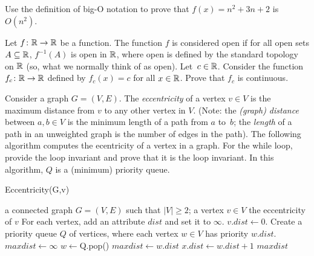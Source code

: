 \documentclass{article}
\begin{document}
\nextprob{}
Use the definition of big-O notation to prove that $f(x)=n^2 + 3n +2$ is
$O(n^2)$.

\nextprob{}
Let $f \colon {\mathbb R} \to {\mathbb R}$ be a function.
The function $f$ is considered open if for all open sets $A \subseteq {\mathbb R}$,
$f^{-1}(A)$ is open in ${\mathbb R}$, where open is defined by the standard topology on
${\mathbb R}$ (so, what we normally think of as open).  Let~$c \in {\mathbb R}$.  Consider the
function $f_c \colon {\mathbb R} \to {\mathbb R}$ defined by $f_c(x) = c$ for all $x \in {\mathbb R}$. Prove
that $f_c$ is continuous.

\nextprob{}

Consider a graph $G=(V,E)$. The \emph{eccentricity} of a vertex $v \in V$ is the
maximum distance from $v$ to any other vertex in $V$. (Note: the \emph{(graph) distance} between
$a,b\in V$ is the minimum length of a path from $a$ to~$b$; the \emph{length} of
a path in an unweighted graph is the number of edges in the path). The
following algorithm computes the ecentricity of a vertex in a graph.  For the
while loop, provide the loop invariant and prove that it is the loop invariant.
In this algorithm, $Q$ is a (minimum) priority queue.

\begin{algorithm}
    \caption{Eccentricity(G,v)}
    \begin{algorithmic}[1]
        \REQUIRE a connected graph $G=(V,E)$ such that $|V| \geq 2$; a vertex $v \in V$
        \ENSURE the eccentricity of $v$
        \STATE For each vertex, add an attribute $dist$ and set it to $\infty$.
        \STATE $v.dist \gets 0$.
        \STATE Create a priority queue $Q$ of vertices, where each
                vertex $w\in V$ has priority $w.dist$.
        \STATE $maxdist \gets \infty$
            \STATE $w \gets $Q.pop() 
            \STATE $maxdist \gets w.dist$
                \STATE $x.dist \gets w.dist +1$
            \ENDFOR
        \ENDWHILE
        \RETURN $maxdist$
    \end{algorithmic}
\end{algorithm}
\end{document}

